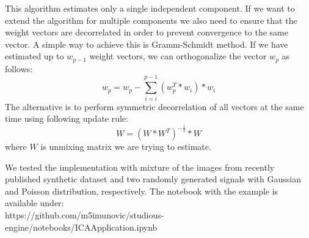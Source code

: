 \documentclass{article}
\begin{document}
This algorithm estimates only a single independent component. If we want to extend the algorithm for multiple components we also need to ensure that the weight vectors are decorrelated in order to prevent
convergence to the same vector. A simple way to achieve this is Gramm-Schmidt method. If we have estimated
up to $w_{p-1}$ weight vectors, we can orthogonalize the vector $w_p$ as follows:
\begin{equation}
    w_p = w_p - \sum_{i=i}^{p-1}(w_{p}^T*w_i)*w_i
\end{equation}
The alternative is to perform symmetric decorrelation of all vectors at the same time using following update rule:
\begin{equation}
    W = (W*W^T)^{-\frac{1}{2
    }}*W
\end{equation}
where $W$ is unmixing matrix we are trying to estimate.

We tested the implementation with mixture of the images from recently published synthetic dataset \cite{bae2023digiface1m} and two randomly generated signals with Gaussian and Poisson distribution, respectively. The notebook with the example is available under: \\
https://github.com/m5imunovic/studious-engine/notebooks/ICAApplication.ipynb


\end{document}
